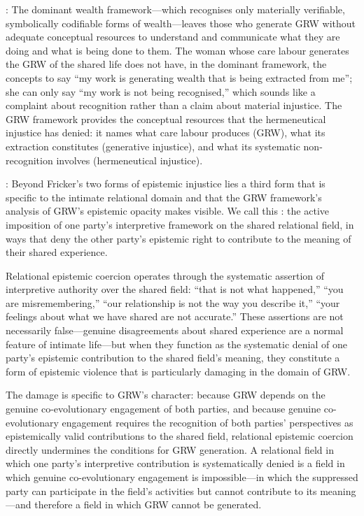 : The dominant wealth framework---which recognises only materially verifiable, symbolically codifiable forms of wealth---leaves those who generate GRW without adequate conceptual resources to understand and communicate what they are doing and what is being done to them. The woman whose care labour generates the GRW of the shared life does not have, in the dominant framework, the concepts to say ``my work is generating wealth that is being extracted from me''; she can only say ``my work is not being recognised,'' which sounds like a complaint about recognition rather than a claim about material injustice. The GRW framework provides the conceptual resources that the hermeneutical injustice has denied: it names what care labour produces (GRW), what its extraction constitutes (generative injustice), and what its systematic non-recognition involves (hermeneutical injustice).

: Beyond Fricker's two forms of epistemic injustice lies a third form that is specific to the intimate relational domain and that the GRW framework's analysis of GRW's epistemic opacity makes visible. We call this : the active imposition of one party's interpretive framework on the shared relational field, in ways that deny the other party's epistemic right to contribute to the meaning of their shared experience.

Relational epistemic coercion operates through the systematic assertion of interpretive authority over the shared field: ``that is not what happened,'' ``you are misremembering,'' ``our relationship is not the way you describe it,'' ``your feelings about what we have shared are not accurate.'' These assertions are not necessarily false---genuine disagreements about shared experience are a normal feature of intimate life---but when they function as the systematic denial of one party's epistemic contribution to the shared field's meaning, they constitute a form of epistemic violence that is particularly damaging in the domain of GRW.

The damage is specific to GRW's character: because GRW depends on the genuine co-evolutionary engagement of both parties, and because genuine co-evolutionary engagement requires the recognition of both parties' perspectives as epistemically valid contributions to the shared field, relational epistemic coercion directly undermines the conditions for GRW generation. A relational field in which one party's interpretive contribution is systematically denied is a field in which genuine co-evolutionary engagement is impossible---in which the suppressed party can participate in the field's activities but cannot contribute to its meaning---and therefore a field in which GRW cannot be generated.

